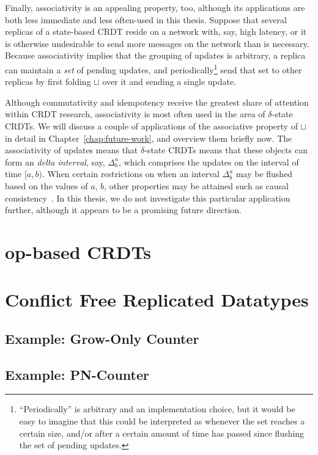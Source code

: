 Finally, associativity is an appealing property, too, although its applications
are both less immediate and less often-used in this thesis. Suppose that several
replicas of a state-based CRDT reside on a network with, say, high latency, or
it is otherwise undesirable to send more messages on the network than is
necessary. Because associativity implies that the grouping of updates is
arbitrary, a replica can maintain a \textit{set} of pending updates, and
periodically\footnote{``Periodically'' is arbitrary and an implementation
choice, but it would be easy to imagine that this could be interpreted as
whenever the set reaches a certain size, and/or after a certain amount of time
has passed since flushing the set of pending updates.} send that set to other
replicas by first folding $\sqcup$ over it and sending a single update.

Although commutativity and idempotency receive the greatest share of attention
within CRDT research, associativity is most often used in the area of
$\delta$-state CRDTs. We will discuss a couple of applications of the
associative property of $\sqcup$ in detail in Chapter~\ref{chap:future-work},
and overview them briefly now. The associativity of updates means that
$\delta$-state CRDTs means that these objects can form an \emph{delta interval},
say, $\Delta^a_b$, which comprises the updates on the interval of time $[a,b)$.
When certain restrictions on when an interval $\Delta^a_b$ may be flushed based
on the values of $a$, $b$, other properties may be attained such as causal
consistency~\citep{almedia18}. In this thesis, we do not investigate this
particular application further, although it appears to be a promising future
direction.

\section{op-based CRDTs}
\label{sec:op-based-crdts}

\section{Conflict Free Replicated Datatypes}
\subsection{Example: Grow-Only Counter}
\label{sec:example-gcounter}

\subsection{Example: PN-Counter}
